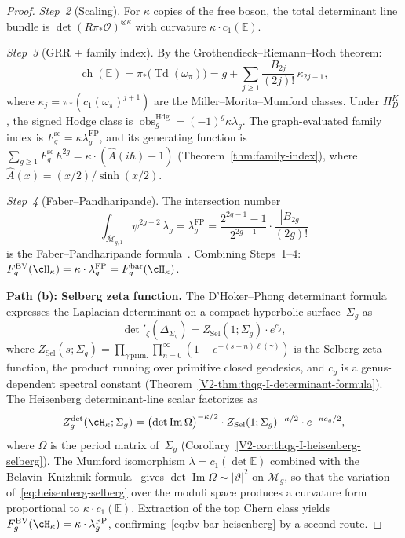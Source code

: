 \begin{proof}
\emph{Step~2} \textup{(}Scaling\textup{)}.
For $\kappa$ copies of the free boson, the total
determinant line bundle is
$\det(R\pi_*\mathcal{O})^{\otimes\kappa}$
with curvature $\kappa \cdot c_1(\mathbb{E})$.

\emph{Step~3} \textup{(}GRR + family index\textup{)}.
By the Grothendieck--Riemann--Roch theorem:
\[
\operatorname{ch}(\mathbb{E})
= \pi_*\bigl(\operatorname{Td}(\omega_\pi)\bigr)
= g + \sum_{j \geq 1}
\frac{B_{2j}}{(2j)!}\,\kappa_{2j-1},
\]
where $\kappa_j = \pi_*(c_1(\omega_\pi)^{j+1})$ are the
Miller--Morita--Mumford classes. Under $H_D^K$, the signed Hodge
class is $\operatorname{obs}^{\mathrm{Hdg}}_g
=(-1)^g\kappa\lambda_g$.  The graph-evaluated family index is
$F_g^{\mathrm{sc}}=\kappa\lambda_g^{\mathrm{FP}}$, and its generating
function is
$\sum_{g \geq 1}F_g^{\mathrm{sc}}\,\hbar^{2g}
= \kappa\cdot(\hat{A}(i\hbar) - 1)$
\textup{(}Theorem~\ref{thm:family-index}\textup{)},
where $\hat{A}(x) = (x/2)/\sinh(x/2)$.

\emph{Step~4} \textup{(}Faber--Pandharipande\textup{)}.
The intersection number
\[
\int_{\overline{\mathcal{M}}_{g,1}}
\psi^{2g-2}\,\lambda_g
= \lambda_g^{\mathrm{FP}}
= \frac{2^{2g-1}-1}{2^{2g-1}}
\cdot \frac{|B_{2g}|}{(2g)!}
\]
is the Faber--Pandharipande formula~\cite{FP00}.
Combining Steps~1--4:
$F_g^{\mathrm{BV}}(\cH_\kappa)
= \kappa \cdot \lambda_g^{\mathrm{FP}}
= F_g^{\mathrm{bar}}(\cH_\kappa)$.

\medskip
\noindent\textbf{Path \textup{(b)}: Selberg zeta function.}
The D'Hoker--Phong determinant formula~\cite{DP86} expresses
the Laplacian determinant on a compact hyperbolic
surface~$\Sigma_g$ as
\begin{equation}\label{eq:dhoker-phong-det}
\det\nolimits'_\zeta(\Delta_{\Sigma_g})
= Z_{\mathrm{Sel}}(1;\Sigma_g)\cdot e^{c_g},
\end{equation}
where $Z_{\mathrm{Sel}}(s;\Sigma_g)
= \prod_{\gamma\, \text{prim.}} \prod_{n=0}^\infty
(1 - e^{-(s+n)\ell(\gamma)})$
is the Selberg zeta function, the product running
over primitive closed geodesics, and $c_g$ is a genus-dependent
spectral constant
\textup{(}Theorem~\ref{V2-thm:thqg-I-determinant-formula}\textup{)}.
The Heisenberg determinant-line scalar factorizes as
\begin{equation}\label{eq:heisenberg-selberg}
Z_g^{\mathrm{det}}(\cH_\kappa;\Sigma_g)
= \bigl(\det\operatorname{Im}\Omega\bigr)^{-\kappa/2}
\cdot Z_{\mathrm{Sel}}(1;\Sigma_g)^{-\kappa/2}
\cdot e^{-\kappa c_g/2},
\end{equation}
where $\Omega$ is the period matrix of~$\Sigma_g$
\textup{(}Corollary~\ref{V2-cor:thqg-I-heisenberg-selberg}\textup{)}.
The Mumford isomorphism
$\lambda = c_1(\det\mathbb{E})$ combined with the
Belavin--Knizhnik formula~\cite{BK86} gives
$\det\operatorname{Im}\Omega \sim |\vartheta|^2$ on
$\mathcal{M}_g$, so that the variation of~\eqref{eq:heisenberg-selberg}
over the moduli space produces a curvature form proportional
to $\kappa \cdot c_1(\mathbb{E})$. Extraction of
the top Chern class yields
$F_g^{\mathrm{BV}}(\cH_\kappa)
= \kappa \cdot \lambda_g^{\mathrm{FP}}$,
confirming~\eqref{eq:bv-bar-heisenberg} by a second route.


\end{proof}
